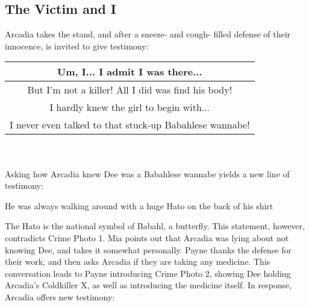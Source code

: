\subsection{The Victim and I}
Arcadia takes the stand, and after a sneeze- and cough- filled defense of their innocence, is invited to give testimony:\\
\begin{tabular}{c}
Um, I... I admit I was there... \\\hline
But I'm not a killer! All I did was find his body!\\\hline
I hardly knew the girl to begin with...\\\hline
I never even talked to that stuck-up Babahlese wannabe! \\\hline
\end{tabular}\\
\\
Asking how Arcadia knew Dee was a Babahlese wannabe yields a new line of testimony:\\
\begin{center}
He was always walking around with a huge Hato on the back of his shirt
\end{center}
The Hato is the national symbol of Babahl, a butterfly. This statement, however, contradicts Crime Photo 1. Mia points out that Arcadia was lying about not knowing Dee, and takes it somewhat personally. Payne thanks the defense for their work, and then asks Arcadia if they are taking any medicine. This conversation leads to Payne introducing Crime Photo 2, showing Dee holding Arcadia's Coldkiller X, as well as introducing the medicine itself. In response, Arcadia offers new testimony:

